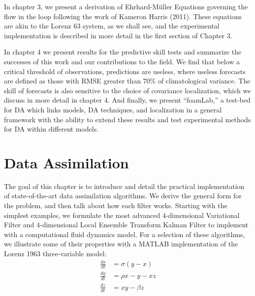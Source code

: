 \documentclass[12pt]{report}
\begin{document}
In chapter 3, we present a derivation of Ehrhard-M\"{u}ller Equations governing the flow in the loop following the work of Kameron Harris (2011).
These equations are akin to the Lorenz 63 system, as we shall see, and the experimental implementation is described in more detail in the first section of Chapter 3.

In chapter 4 we present results for the predictive skill tests and summarize the successes of this work and our contributions to the field.
We find that below a critical threshold of observations, predictions are useless, where useless forecasts are defined as those with RMSE greater than 70\% of climatological variance.
The skill of forecasts is also sensitive to the choice of covariance localization, which we discuss in more detail in chapter 4.
And finally, we present ``foamLab,'' a test-bed for DA which links models, DA techniques, and localization in a general framework with the ability to extend these results and test experimental methods for DA within different models.

\newcommand{\mbe}{\mathbf{\epsilon}}
\newcommand{\mbx}{\mathbf{x}}
\newcommand{\mby}{\mathbf{y}}
\newcommand{\mbd}{\mathbf{d}}
\newcommand{\mbB}{\mathbf{B}}
\newcommand{\mbW}{\mathbf{W}}
\newcommand{\mbR}{\mathbf{R}}
\newcommand{\mbH}{\mathbf{H}}
\newcommand{\mbK}{\mathbf{K}}
\newcommand{\mbP}{\mathbf{P}}
\newcommand{\mbZ}{\mathbf{Z}}
\newcommand{\mbw}{\mathbf{w}}
\newcommand{\mbX}{\mathbf{X}}
\newcommand{\mbY}{\mathbf{Y}}
\newcommand{\mb}{\mathbf{}}
\newcommand{\expv}[1]{E \left [ #1 \right ]}

\chapter{Data Assimilation}
The goal of this chapter is to introduce and detail the practical implementation of state-of-the-art data assimilation algorithms.
We derive the general form for the problem, and then talk about how each filter works.
Starting with the simplest examples, we formulate the most advanced 4-dimensional Variational Filter and 4-dimensional Local Ensemble Transform Kalman Filter to implement with a computational fluid dynamics model.
For a selection of these algorithms, we illustrate some of their properties with a MATLAB implementation of the Lorenz 1963 three-variable model: \begin{align*}
\frac{dx}{dt} &= \sigma (y-x)\\
\frac{dy}{dt} &= \rho x - y -xz \\
\frac{dz}{dt} &= xy -  \beta z\end{align*}
\end{document}
